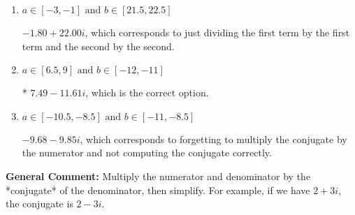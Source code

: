 \documentclass{extbook}[14pt]
\begin{document}
\begin{enumerate}
{\begin{enumerate}[label=\Alph*.]
 $7.49  - 476.00 i$, which corresponds to forgetting to multiply the conjugate by the numerator.
\item \( a \in [-3, -1] \text{ and } b \in [21.5, 22.5] \)

 $-1.80  + 22.00 i$, which corresponds to just dividing the first term by the first term and the second by the second.
\item \( a \in [6.5, 9] \text{ and } b \in [-12, -11] \)

* $7.49  - 11.61 i$, which is the correct option.
\item \( a \in [-10.5, -8.5] \text{ and } b \in [-11, -8.5] \)

 $-9.68  - 9.85 i$, which corresponds to forgetting to multiply the conjugate by the numerator and not computing the conjugate correctly.
\end{enumerate}

\textbf{General Comment:} Multiply the numerator and denominator by the *conjugate* of the denominator, then simplify. For example, if we have $2+3i$, the conjugate is $2-3i$.
}
\end{enumerate}
\end{document}
